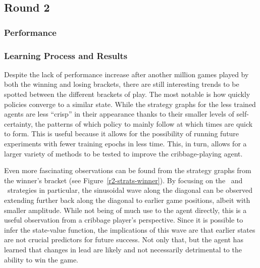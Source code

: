 
\subsection{Round 2}
\label{sec:findings-r2}

\subsubsection*{Performance}
\label{sec:findings-r2-perf}








\subsubsection*{Learning Process and Results}
\label{sec:findings-r2-results}




Despite the lack of performance increase after another million games played by
both the winning and losing brackets,
there are still interesting trends to be spotted between the different brackets
of play.
%
The most notable is how quickly policies converge to a similar state.
%
While the strategy graphs for the less trained agents are less ``crisp''
in their appearance thanks to their smaller levels of self-certainty,
the patterns of which policy to mainly follow at which times
are quick to form.
%
This is useful because it allows for the possibility of running future
experiments with fewer training epochs in less time.
%
This, in turn, allows for a larger variety of methods to be tested to improve
the cribbage-playing agent.

Even more fascinating observations can be found from the strategy graphs
from the winner's bracket (see Figure~\ref{r2-strats-winner}).
%
By focusing on the \handmaxmin\ and \handmaxavg\ strategies in particular,
the sinusoidal wave along the diagonal can be observed extending further
back along the diagonal to earlier game positions,
albeit with smaller amplitude.
%
While not being of much use to the agent directly,
this is a useful observation from a cribbage player's perspective.
%
Since it is possible to infer the state-value function,
the implications of this wave are that earlier states are not crucial
predictors for future success.
%
Not only that,
but the agent has learned that changes in lead are likely and not necessarily
detrimental to the ability to win the game.

